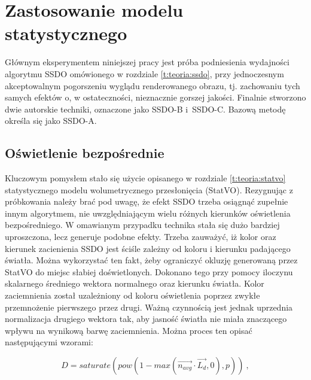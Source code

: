 	\section{Zastosowanie modelu statystycznego}
	\label{t:algorytm:stat}
	
	
	Głównym eksperymentem niniejszej pracy jest próba podniesienia wydajności algorytmu SSDO omówionego w rozdziale \ref{t:teoria:ssdo}, przy jednoczesnym akceptowalnym pogorszeniu wyglądu renderowanego obrazu, tj. zachowaniu tych samych efektów o, w ostateczności, nieznacznie gorszej jakości. Finalnie stworzono dwie autorskie techniki, oznaczone jako SSDO-B i~SSDO-C. Bazową metodę określa się jako SSDO-A.
	
		\subsection{Oświetlenie bezpośrednie}
		\label{t:algorytm:stat:direct}
		
		Kluczowym pomysłem stało się użycie opisanego w rozdziale \ref{t:teoria:statvo} statystycznego modelu wolumetrycznego przesłonięcia (StatVO). Rezygnując z próbkowania należy brać pod uwagę, że efekt SSDO trzeba osiągnąć zupełnie innym algorytmem, nie uwzględniającym wielu różnych kierunków oświetlenia bezpośredniego. W omawianym przypadku technika stała się dużo bardziej uproszczona, lecz generuje podobne efekty. Trzeba zauważyć, iż kolor oraz kierunek zacienienia SSDO jest ściśle zależny od koloru i kierunku padającego światła. Można wykorzystać ten fakt, żeby ograniczyć okluzję generowaną przez StatVO do miejsc słabiej doświetlonych. Dokonano tego przy pomocy iloczynu skalarnego średniego wektora normalnego oraz kierunku światła. Kolor zaciemnienia został uzależniony od koloru oświetlenia poprzez zwykłe przemnożenie pierwszego przez drugi. Ważną czynnością jest jednak uprzednia normalizacja drugiego wektora tak, aby jasność światła nie miała znaczącego wpływu na wynikową barwę zaciemnienia. Można proces ten opisać następującymi wzorami:
		
		\begin{equation}
		D = saturate(pow(1 - max(\vec{n_{avg}} \cdot \vec{L_{d}}, 0), p))\ ,
		\end{equation}
		
